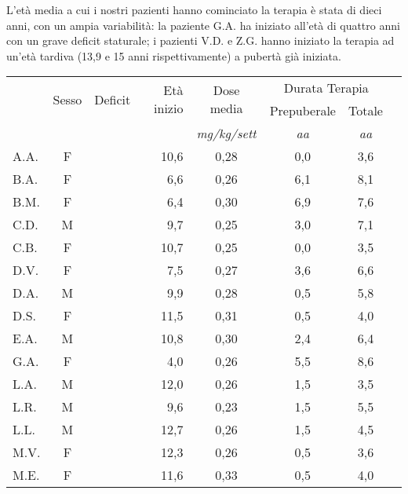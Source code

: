 L'età media a cui i nostri pazienti hanno cominciato la terapia è stata di dieci anni, con un ampia variabilità: la paziente G.A. ha iniziato all'età di quattro anni con un grave deficit staturale; i pazienti V.D. e Z.G. hanno iniziato la terapia ad un'età tardiva (13,9 e 15 anni rispettivamente) a pubertà già iniziata.
\begin{table}[!h]
\begin{center}
\begin{tabular}{lccrcccl}
\toprule
 &    \multirow{2}{*}{Sesso} &
 \multirow{2}{*}{Deficit}    & \multirow{2}{*}{Età inizio} & \multirow{2}{*}{Dose media} & \multicolumn{2}{c}{Durata Terapia}\\
\cmidrule(r){6-7}
 &       &   &    &  	& Prepuberale & Totale \\
 &     &	&			& \emph{mg/kg/sett}	& \emph{aa} & \emph{aa} \\
\midrule                                  	
A.A.	& F &  		 & 10,6  	&  0,28     	& 0,0                 & 3,6  \\
B.A.	& F & \checkmark & 6,6   	&  0,26     	& 6,1                 & 8,1  \\
B.M.	& F & \checkmark & 6,4   	&  0,30     	& 6,9                 & 7,6  \\
C.D.	& M &  	  	 & 9,7   	&  0,25     	& 3,0                 & 7,1  \\
C.B.	& F &  		 & 10,7  	&  0,25     	& 0,0                 & 3,5  \\
D.V.	& F & \checkmark & 7,5   	&  0,27     	& 3,6                 & 6,6  \\
D.A.	& M &  		 & 9,9   	&  0,28     	& 0,5                 & 5,8  \\
D.S.	& F & \checkmark & 11,5  	&  0,31     	& 0,5                 & 4,0  \\
E.A.	& M &  		 & 10,8  	&  0,30     	& 2,4                 & 6,4  \\
G.A.	& F &  		 & 4,0   	&  0,26     	& 5,5                 & 8,6  \\
L.A.	& M & \checkmark & 12,0  	&  0,26     	& 1,5                 & 3,5  \\
L.R.	& M &  		 & 9,6   	&  0,23     	& 1,5                 & 5,5  \\
L.L.	& M &  		 & 12,7  	&  0,26     	& 1,5                 & 4,5  \\
M.V.	& F & \checkmark & 12,3  	&  0,26     	& 0,5                 & 3,6  \\
M.E.	& F &  		 & 11,6  	&  0,33     	& 0,5                 & 4,0  \\

\end{tabular}
\end{center}
\end{table}
